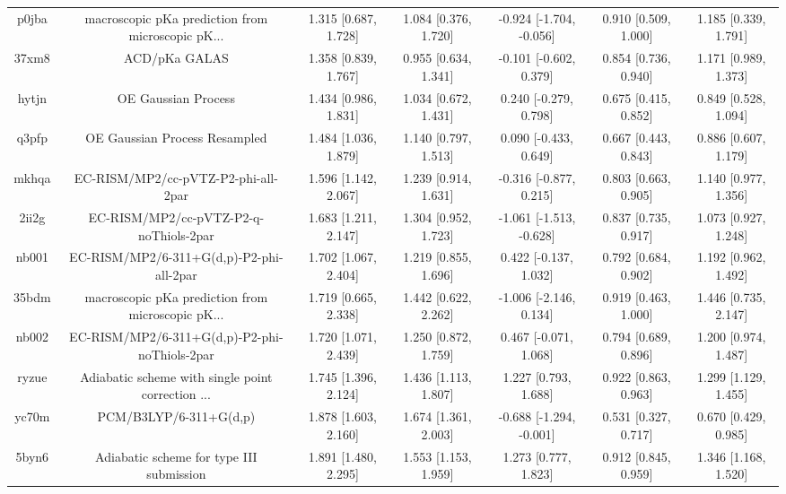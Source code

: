 \documentclass{article}
\begin{document}
\begin{center}
\begin{longtable}{|ccccccc|}
 p0jba &  macroscopic pKa prediction from microscopic pK... &  1.315 [0.687, 1.728] &  1.084 [0.376, 1.720] &  -0.924 [-1.704, -0.056] &  0.910 [0.509, 1.000] &   1.185 [0.339, 1.791] \\
 37xm8 &                                      ACD/pKa GALAS &  1.358 [0.839, 1.767] &  0.955 [0.634, 1.341] &   -0.101 [-0.602, 0.379] &  0.854 [0.736, 0.940] &   1.171 [0.989, 1.373] \\
 hytjn &                                OE Gaussian Process &  1.434 [0.986, 1.831] &  1.034 [0.672, 1.431] &    0.240 [-0.279, 0.798] &  0.675 [0.415, 0.852] &   0.849 [0.528, 1.094] \\
 q3pfp &                      OE Gaussian Process Resampled &  1.484 [1.036, 1.879] &  1.140 [0.797, 1.513] &    0.090 [-0.433, 0.649] &  0.667 [0.443, 0.843] &   0.886 [0.607, 1.179] \\
 mkhqa &                EC-RISM/MP2/cc-pVTZ-P2-phi-all-2par &  1.596 [1.142, 2.067] &  1.239 [0.914, 1.631] &   -0.316 [-0.877, 0.215] &  0.803 [0.663, 0.905] &   1.140 [0.977, 1.356] \\
 2ii2g &             EC-RISM/MP2/cc-pVTZ-P2-q-noThiols-2par &  1.683 [1.211, 2.147] &  1.304 [0.952, 1.723] &  -1.061 [-1.513, -0.628] &  0.837 [0.735, 0.917] &   1.073 [0.927, 1.248] \\
 nb001 &           EC-RISM/MP2/6-311+G(d,p)-P2-phi-all-2par &  1.702 [1.067, 2.404] &  1.219 [0.855, 1.696] &    0.422 [-0.137, 1.032] &  0.792 [0.684, 0.902] &   1.192 [0.962, 1.492] \\
 35bdm &  macroscopic pKa prediction from microscopic pK... &  1.719 [0.665, 2.338] &  1.442 [0.622, 2.262] &   -1.006 [-2.146, 0.134] &  0.919 [0.463, 1.000] &   1.446 [0.735, 2.147] \\
 nb002 &      EC-RISM/MP2/6-311+G(d,p)-P2-phi-noThiols-2par &  1.720 [1.071, 2.439] &  1.250 [0.872, 1.759] &    0.467 [-0.071, 1.068] &  0.794 [0.689, 0.896] &   1.200 [0.974, 1.487] \\
 ryzue &  Adiabatic scheme with single point correction ... &  1.745 [1.396, 2.124] &  1.436 [1.113, 1.807] &     1.227 [0.793, 1.688] &  0.922 [0.863, 0.963] &   1.299 [1.129, 1.455] \\
 yc70m &                             PCM/B3LYP/6-311+G(d,p) &  1.878 [1.603, 2.160] &  1.674 [1.361, 2.003] &  -0.688 [-1.294, -0.001] &  0.531 [0.327, 0.717] &   0.670 [0.429, 0.985] \\
 5byn6 &           Adiabatic scheme for type III submission &  1.891 [1.480, 2.295] &  1.553 [1.153, 1.959] &     1.273 [0.777, 1.823] &  0.912 [0.845, 0.959] &   1.346 [1.168, 1.520] \\

\end{longtable}
\end{center}
\end{document}
